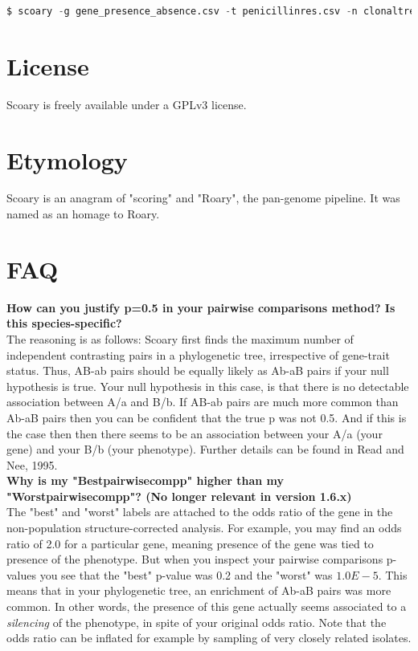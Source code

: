 \documentclass{article}
\begin{document}
    \begin{lstlisting}[language=python, basicstyle=\small]
      $ scoary -g gene_presence_absence.csv -t penicillinres.csv -n clonaltree.nwk
    \end{lstlisting}

  \section{License}
    Scoary is freely available under a GPLv3 license. \\

  \section{Etymology}
    Scoary is an anagram of "scoring" and "Roary", the pan-genome pipeline. It was named as an homage to Roary. \\

  \section{FAQ}
    \textbf{How can you justify p=0.5 in your pairwise comparisons method? Is this species-specific?} \\

    The reasoning is as follows: Scoary first finds the maximum number of independent contrasting pairs in a phylogenetic tree, irrespective of gene-trait status. Thus, AB-ab pairs should be equally likely as Ab-aB pairs if your null hypothesis is true. Your null hypothesis in this case, is that there is no detectable association between A/a and B/b. If AB-ab pairs are much more common than Ab-aB pairs then you can be confident that the true p was not 0.5. And if this is the case then then there seems to be an association between your A/a (your gene) and your B/b (your phenotype). Further details can be found in Read and Nee, 1995. \\
    
    \textbf{Why is my "Best\textunderscore pairwise\textunderscore comp\textunderscore p" higher than my "Worst\textunderscore pairwise\textunderscore comp\textunderscore p"? (No longer relevant in version 1.6.x)}\\

    The "best" and "worst" labels are attached to the odds ratio of the gene in the non-population structure-corrected analysis. For example, you may find an odds ratio of 2.0 for a particular gene, meaning presence of the gene was tied to presence of the phenotype. But when you inspect your pairwise comparisons p-values you see that the "best" p-value was 0.2 and the "worst" was $1.0E-5$. This means that in your phylogenetic tree, an enrichment of Ab-aB pairs was more common. In other words, the presence of this gene actually seems associated to a \textit{silencing} of the phenotype, in spite of your original odds ratio. Note that the odds ratio can be inflated for example by sampling of very closely related isolates. \\
    
\end{document}
